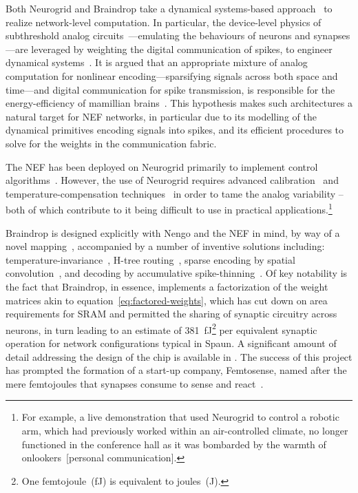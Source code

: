 Both Neurogrid and Braindrop take a dynamical systems-based approach~\citep{arthur2011silicon, gao2012dynamical} to realize network-level computation.
In particular, the device-level physics of subthreshold analog circuits~\citep{andreou1991current}---emulating the behaviours of neurons and synapses---are leveraged by weighting the digital communication of spikes, to engineer dynamical systems~\citep{dethier2011brain}.
It is argued that an appropriate mixture of analog computation for nonlinear encoding---sparsifying signals across both space and time---and digital communication for spike transmission, is responsible for the energy-efficiency of mamillian brains~\citep{boahen2017neuromorph}.
This hypothesis makes such architectures a natural target for NEF networks, in particular due to its modelling of the dynamical primitives encoding signals into spikes, and its efficient procedures to solve for the weights in the communication fabric.

The NEF has been deployed on Neurogrid primarily to implement control algorithms~\citep{dethier2011brain, choudhary2012silicon, menon2014controlling}.
However, the use of Neurogrid requires advanced calibration~\citep{kauderer2017calibrating} and temperature-compensation techniques~\citep{abrams2017} in order to tame the analog variability -- both of which contribute to it being difficult to use in practical applications.\footnote{
For example, a live demonstration that used Neurogrid to control a robotic arm, which had previously worked within an air-controlled climate, no longer functioned in the conference hall as it was bombarded by the warmth of onlookers~[personal communication].}

Braindrop is designed explicitly with Nengo and the NEF in mind, by way of a novel mapping~\citep{voelker2017iscas, neckar2018optimizing}, accompanied by a number of inventive solutions including: temperature-invariance~\citep{abrams2017, reidpint2019, benjamintemp2019}, H-tree routing~\citep{fokserial2018}, sparse encoding by spatial convolution~\citep{feinstein1988hexagonal, braindrop2019}, and decoding by accumulative spike-thinning~\citep{fokthinning2019}.
Of key notability is the fact that Braindrop, in essence, implements a factorization of the weight matrices akin to equation~\ref{eq:factored-weights}, which has cut down on area requirements for SRAM and permitted the sharing of synaptic circuitry across neurons, in turn leading to an estimate of 381~fJ\footnote{
One femtojoule~(fJ) is equivalent to  joules~(J).}
per equivalent synaptic operation for network configurations typical in Spaun.
A significant amount of detail addressing the design of the chip is available in \citet{neckar2018braindrop, fok2018communicating, braindrop2019}.
The success of this project has prompted the formation of a start-up company, Femtosense, named after the mere femtojoules that synapses consume to sense and react~\citep{femtosense}. 

